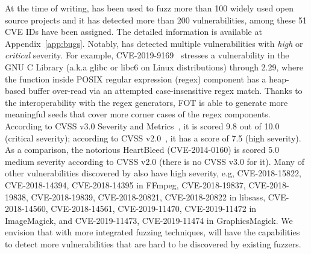 At the time of writing, {\FOT} has been used to fuzz more than 100 widely used open source projects and it has detected more than 200 vulnerabilities, among these 51 CVE IDs have been assigned. The detailed information is available at Appendix~\ref{app:bugs}. Notably, \FOT has detected multiple vulnerabilities with \emph{high} or \emph{critical} severity. For example, CVE-2019-9169~\cite{CVE-2019-9169} stresses a vulnerability in the GNU C Library (a.k.a glibc or libc6 on Linux distributions) through 2.29, where the function  inside POSIX regular expression (regex) component has a heap-based buffer over-read via an attempted case-insensitive regex match. Thanks to the interoperability with the regex generators, FOT is able to generate more meaningful seeds that cover more corner cases of the regex components. According to CVSS v3.0 Severity and Metrics~\cite{cvss3}, it is scored 9.8 out of 10.0 (critical severity); according to CVSS v2.0~\cite{cvss2}, it has a score of 7.5 (high severity). As a comparison, the notorious HeartBleed (CVE-2014-0160) is scored 5.0 medium severity according to CVSS v2.0 (there is no CVSS v3.0 for it). Many of other vulnerabilities discovered by \FOT also have high severity, e.g, CVE-2018-15822, CVE-2018-14394, CVE-2018-14395 in FFmpeg, CVE-2018-19837, CVE-2018-19838, CVE-2018-19839, CVE-2018-20821, CVE-2018-20822 in libsass, CVE-2018-14560, CVE-2018-14561, CVE-2019-11470, CVE-2019-11472 in ImageMagick, and CVE-2019-11473, CVE-2019-11474 in GraphicsMagick. We envision that with more integrated fuzzing techniques, \FOT will have the capabilities to detect more vulnerabilities that are hard to be discovered by existing fuzzers.
